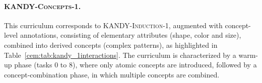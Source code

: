 \paragraph{\textsc{KANDY-Concepts-1}.}
This curriculum corresponds to \textsc{KANDY-Induction-1}, augmented with concept-level annotations, consisting of elementary attributes (shape, color and size), combined into derived concepts (complex patterns), as highlighted in Table~\ref{cem:tab:kandy_1interactions}. The curriculum is characterized by a warm-up phase (tasks 0 to 8), where only atomic concepts are introduced, followed by a concept-combination phase, in which multiple concepts are combined.

\begin{table}[h]
	\centering
\end{table}
